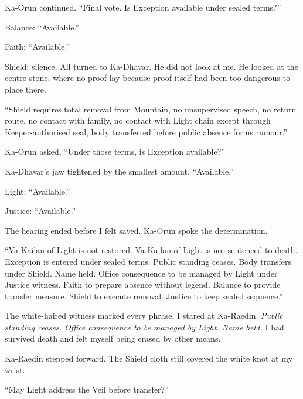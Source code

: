 Ka-Orun continued. ``Final vote. Is Exception available under sealed terms?''\par

Balance: ``Available.''\par

Faith: ``Available.''\par

Shield: silence. All turned to Ka-Dhavar. He did not look at me. He looked at the centre stone, where no proof lay because proof itself had been too dangerous to place there.\par

``Shield requires total removal from Mountain, no unsupervised speech, no return route, no contact with family, no contact with Light chain except through Keeper-authorised seal, body transferred before public absence forms rumour.''\par

Ka-Orun asked, ``Under those terms, is Exception available?''\par

Ka-Dhavar's jaw tightened by the smallest amount. ``Available.''\par

Light: ``Available.''\par

Justice: ``Available.''\par

The hearing ended before I felt saved. Ka-Orun spoke the determination.\par

``Va-Kailan of Light is not restored. Va-Kailan of Light is not sentenced to death. Exception is entered under sealed terms. Public standing ceases. Body transfers under Shield. Name held. Office consequence to be managed by Light under Justice witness. Faith to prepare absence without legend. Balance to provide transfer measure. Shield to execute removal. Justice to keep sealed sequence.''\par

The white-haired witness marked every phrase. I stared at Ka-Raedin. \emph{Public standing ceases. Office consequence to be managed by Light. Name held.} I had survived death and felt myself being erased by other means.\par

Ka-Raedin stepped forward. The Shield cloth still covered the white knot at my wrist.\par

``May Light address the Veil before transfer?''\par

